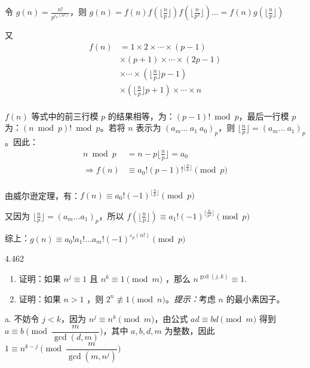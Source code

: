 令 \( g(n) = \frac{n!}{p^{\varepsilon_p (n!)}} \)，则 \( g(n) = f(n) f(\lfloor \frac{n}{p} \rfloor) f(\lfloor \frac{n}{p^2} \rfloor) \dots = f(n) g(\lfloor \frac{n}{p} \rfloor) \)

又
\begin{align*}
  f(n) &= 1 \times 2 \times \cdots \times (p-1) \\
  & \times (p+1) \times \cdots \times (2p-1) \\
  & \times \cdots \times (\lfloor \frac{n}{p} \rfloor p - 1) \\
  & \times (\lfloor \frac{n}{p} \rfloor p + 1) \times \cdots \times n \\
\end{align*}

\( f(n) \) 等式中的前三行模 \( p \) 的结果相等，为：\( (p-1)! \bmod p \)，最后一行模 \( p \) 为：\( (n \bmod p)! \bmod p \)。若将 \( n \) 表示为 \( (a_m \dots \ a_1 \ a_0)_p \)，则 \( \lfloor \frac{n}{p} \rfloor = (a_m \dots \ a_1)_p \)。因此：
\begin{align*}
  n \bmod p &= n - p \lfloor \frac{n}{p} \rfloor = a_0 \\
  \Rightarrow f(n) &\equiv a_0! (p-1)!^{\lfloor \frac{n}{p} \rfloor} \pmod{p} \\
\end{align*}

由威尔逊定理，有：\( f(n) \equiv a_0! (-1)^{\lfloor \frac{n}{p} \rfloor} \pmod{p} \)

又因为 \( \lfloor \frac{n}{p} \rfloor = (a_m \dots a_1)_p \)，所以 \( f(\lfloor \frac{n}{p} \rfloor) \equiv a_1!(-1)^{\lfloor \frac{n}{p^2} \rfloor} \pmod{p} \)

综上：\( g(n) \equiv a_0! a_1! \dots a_m! (-1)^{\varepsilon_p(n!)} \pmod{p} \)

\begin{problem}{4.46}{2}
  \begin{enumerate}
    \item[a] 证明：如果 \( n^j \equiv 1 \) 且 \( n^k \equiv 1 \pmod{m} \) ，那么 \( n^{\gcd{(j ,k)}} \equiv 1 \).
    \item[b] 证明：如果 \( n > 1 \) ，则 \( 2^n \not\equiv 1 \pmod{n} \)。\textit{提示：}考虑 \( n \) 的最小素因子。
  \end{enumerate}
\end{problem}

a. 不妨令 \( j<k \)，因为 \( n^j \equiv n^k \pmod{m} \)，由公式 \( ad \equiv bd \pmod{m} \) 得到 \( a \equiv b \pmod{\dfrac{m}{\gcd{(d, m)}}} \)，其中 \( a, b, d, m \) 为整数，因此 \( 1 \equiv n^{k-j} \pmod{\dfrac{m}{\gcd{(m, n^j)}}} \)

